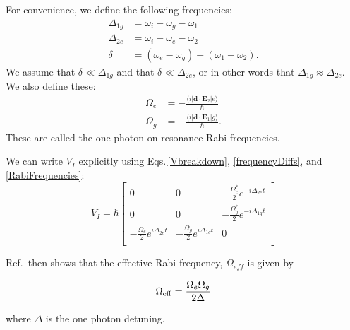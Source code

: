For convenience, we define the following frequencies: 
\begin{align}
\label{frequencyDiffs}
\Delta_{1g}&=\omega_i-\omega_g-\omega_1\\
\Delta_{2e}&=\omega_i-\omega_e-\omega_2\\
\delta&=(\omega_e-\omega_g)-(\omega_1-\omega_2).
\end{align}
We assume that $\delta\ll\Delta_{1g}$ and that $\delta\ll\Delta_{2e}$, or in other words that $\Delta_{1g}\approx\Delta_{2e}$.
We also define these:
\begin{align}
\label{RabiFrequencies}
\Omega_e&=-\frac{\langle i | \mathbf{d}\cdot \mathbf{E}_2 | e\rangle }{\hbar}\\
\Omega_g&=-\frac{\langle i | \mathbf{d}\cdot \mathbf{E}_1 | g\rangle}{\hbar}.
\end{align}
These are called the one photon on-resonance Rabi frequencies.

We can write $V_I$ explicitly using Eqs.\,\eqref{Vbreakdown}, \eqref{frequencyDiffs}, and \eqref{RabiFrequencies}:
\begin{equation}
\label{VI_matrix_simplified}
V_I=
\hbar
\begin{bmatrix}
0 & 0 & -\frac{\Omega_e^*}{2}e^{-i\Delta_{2e}t} \\
0 & 0 & -\frac{\Omega_g^*}{2}e^{-i\Delta_{1g}t}\\
-\frac{\Omega_e}{2}e^{i\Delta_{2e}t} & -\frac{\Omega_{g}}{2}e^{i\Delta_{1g}t} & 0 \\
\end{bmatrix}
\end{equation}

Ref.\,\cite{Young1997363} then shows that the effective Rabi frequency, $\Omega_{\mathit{eff}}$ is given by 

\begin{equation}
\Omega_{\rm eff}=\frac{\Omega_{e} \Omega_{g}}{2 \Delta}
\end{equation}

where $\Delta$ is the one photon detuning. 

